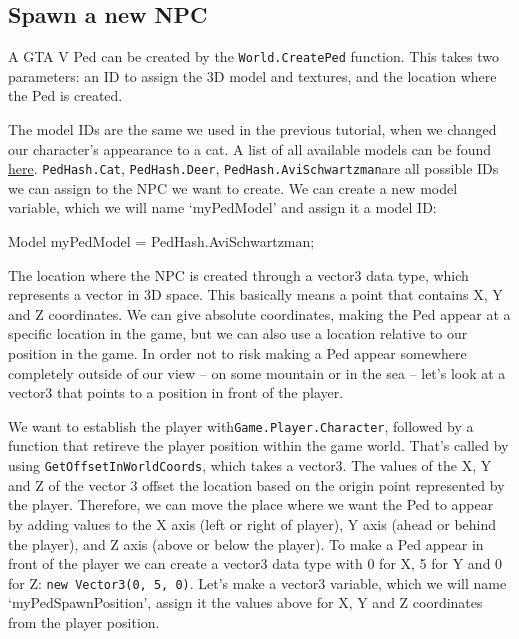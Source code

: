\documentclass[
  openany]{book}
\newenvironment{Shaded}{\begin{snugshade}}{\end{snugshade}}
\newcommand{\FunctionTok}[1]{\textcolor[rgb]{0.00,0.00,0.00}{#1}}
\newcommand{\NormalTok}[1]{#1}
\begin{document}
\hypertarget{spawn-a-new-npc}{%
\subsection*{Spawn a new NPC}\label{spawn-a-new-npc}}

A GTA V Ped can be created by the \texttt{World.CreatePed} function. This takes two parameters: an ID to assign the 3D model and textures, and the location where the Ped is created.

The model IDs are the same we used in the previous tutorial, when we changed our character's appearance to a cat. A list of all available models can be found \href{https://wiki.gtanet.work/index.php/Peds}{here}. \texttt{PedHash.Cat}, \texttt{PedHash.Deer}, \texttt{PedHash.AviSchwartzman}are all possible IDs we can assign to the NPC we want to create.
We can create a new model variable, which we will name `myPedModel' and assign it a model ID:

\begin{Shaded}
\begin{Highlighting}[]
\NormalTok{Model myPedModel = PedHash.}\FunctionTok{AviSchwartzman}\NormalTok{;}
\end{Highlighting}
\end{Shaded}

The location where the NPC is created through a vector3 data type, which represents a vector in 3D space. This basically means a point that contains X, Y and Z coordinates. We can give absolute coordinates, making the Ped appear at a specific location in the game, but we can also use a location relative to our position in the game. In order not to risk making a Ped appear somewhere completely outside of our view -- on some mountain or in the sea -- let's look at a vector3 that points to a position in front of the player.

We want to establish the player with\texttt{Game.Player.Character}, followed by a function that retireve the player position within the game world. That's called by using \texttt{GetOffsetInWorldCoords}, which takes a vector3. The values of the X, Y and Z of the vector 3 offset the location based on the origin point represented by the player. Therefore, we can move the place where we want the Ped to appear by adding values to the X axis (left or right of player), Y axis (ahead or behind the player), and Z axis (above or below the player).
To make a Ped appear in front of the player we can create a vector3 data type with 0 for X, 5 for Y and 0 for Z: \texttt{new\ Vector3(0,\ 5,\ 0)}. Let's make a vector3 variable, which we will name `myPedSpawnPosition', assign it the values above for X, Y and Z coordinates from the player position.
\end{document}
